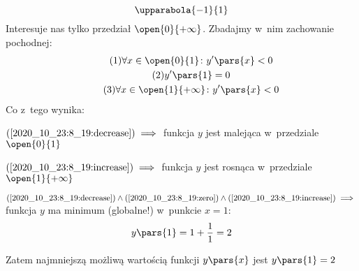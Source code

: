 \begin{equation*}
    \upparabola{-1}{1}
\end{equation*}
Interesuje nas tylko przedział \(\open{0}{+\infty}\). Zbadajmy w~nim zachowanie pochodnej:
\begin{gather*}
    \tag{\(1\)} \forall x \in \open{0}{1}\colon y'\pars{x} < 0 \label{2020_10_23:8_19:decrease}\\
    \tag{\(2\)} y'\pars{1} = 0 \label{2020_10_23:8_19:zero}\\
    \tag{\(3\)} \forall x \in \open{1}{+\infty}\colon y'\pars{x} < 0 \label{2020_10_23:8_19:increase}
\end{gather*}
Co z~tego wynika:
\begin{description}
    \item \(\mbox{(\ref{2020_10_23:8_19:decrease})} \implies\) funkcja \(y\) jest malejąca w~przedziale \(\open{0}{1}\)
    \item \(\mbox{(\ref{2020_10_23:8_19:increase})} \implies\) funkcja \(y\) jest rosnąca w~przedziale \(\open{1}{+\infty}\)
    \item \(\mbox{(\ref{2020_10_23:8_19:decrease})} \land \mbox{(\ref{2020_10_23:8_19:zero})} \land \mbox{(\ref{2020_10_23:8_19:increase})} \implies\) funkcja \(y\) ma minimum (globalne!) w~punkcie \(x = 1\):
        \begin{equation*}
            y\pars{1} = 1 + \frac{1}{1} = 2
        \end{equation*}
\end{description}
Zatem najmniejszą możliwą wartością funkcji \(y\pars{x}\) jest \(y\pars{1} = 2\)
